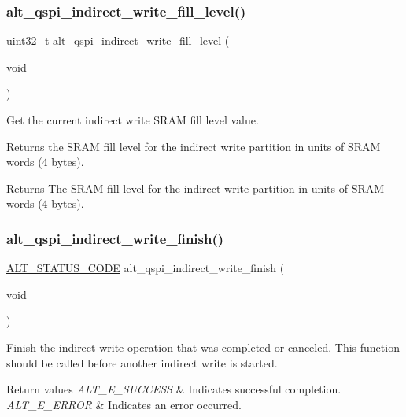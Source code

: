 \subsubsection{\texorpdfstring{alt\_qspi\_indirect\_write\_fill\_level()}{alt\_qspi\_indirect\_write\_fill\_level()}}
{\footnotesize\ttfamily uint32\+\_\+t alt\+\_\+qspi\+\_\+indirect\+\_\+write\+\_\+fill\+\_\+level (\begin{DoxyParamCaption}\item[{void}]{ }\end{DoxyParamCaption})}

Get the current indirect write S\+R\+AM fill level value.

Returns the S\+R\+AM fill level for the indirect write partition in units of S\+R\+AM words (4 bytes).

\begin{DoxyReturn}{Returns}
The S\+R\+AM fill level for the indirect write partition in units of S\+R\+AM words (4 bytes). 
\end{DoxyReturn}
\mbox{\label{group__ALT__QSPI__INDAC_ga8a1da95058c3fd260accfaa4bddd8e2c}} 
\subsubsection{\texorpdfstring{alt\_qspi\_indirect\_write\_finish()}{alt\_qspi\_indirect\_write\_finish()}}
{\footnotesize\ttfamily \mbox{\hyperlink{hwlib_8h_abdb0d369f069723ca55d6c94bcaaaa12}{A\+L\+T\+\_\+\+S\+T\+A\+T\+U\+S\+\_\+\+C\+O\+DE}} alt\+\_\+qspi\+\_\+indirect\+\_\+write\+\_\+finish (\begin{DoxyParamCaption}\item[{void}]{ }\end{DoxyParamCaption})}

Finish the indirect write operation that was completed or canceled. This function should be called before another indirect write is started.


\begin{DoxyRetVals}{Return values}
{\em A\+L\+T\+\_\+\+E\+\_\+\+S\+U\+C\+C\+E\+SS} & Indicates successful completion. \\
\hline
{\em A\+L\+T\+\_\+\+E\+\_\+\+E\+R\+R\+OR} & Indicates an error occurred. \\
\hline
\end{DoxyRetVals}
\mbox{\label{group__ALT__QSPI__INDAC_gacc44a84a99a06afa241272a686f3bb33}} 
